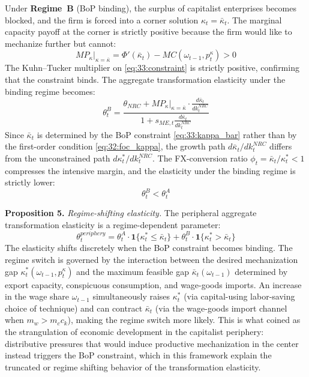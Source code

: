 Under \textbf{Regime~B} (BoP binding), the surplus of capitalist enterprises becomes blocked, and the firm is forced
into a corner solution $\kappa_t = \bar{\kappa}_t$. The
marginal capacity payoff at the corner is strictly positive
because the firm would like to mechanize further but cannot:
\begin{equation}
	MP_\kappa\big|_{\kappa=\bar{\kappa}}
	= \Phi'(\bar{\kappa}_t) - MC(\omega_{t-1}, p^\kappa_t) > 0
	\label{eq:33:MP_corner}
\end{equation}
The Kuhn--Tucker multiplier on \eqref{eq:33:constraint} is
strictly positive, confirming that the constraint binds. The
aggregate transformation elasticity under the binding regime
becomes:
\begin{equation}
	\theta^{B}_t
	= \frac{\theta_{NRC}
		+ MP_\kappa\big|_{\kappa=\bar{\kappa}}
		\cdot \frac{d\bar{\kappa}_t}{dk^{NRC}_t}}
	{1 + s_{ME,t}\frac{d\bar{\kappa}_t}{dk^{NRC}_t}}
	\label{eq:33:theta_B}
\end{equation}
Since $\bar{\kappa}_t$ is determined by the BoP constraint
\eqref{eq:33:kappa_bar} rather than by the first-order
condition \eqref{eq:32:foc_kappa}, the growth path
$d\bar{\kappa}_t / dk^{NRC}_t$ differs from the unconstrained
path $d\kappa_t^* / dk^{NRC}_t$. The FX-conversion ratio
$\phi_t = \bar{\kappa}_t / \kappa_t^* < 1$ compresses the
intensive margin, and the elasticity under the binding regime
is strictly lower:
\begin{equation}
	\theta^{B}_t < \theta^{A}_t
	\label{eq:33:theta_inequality}
\end{equation}

\textbf{Proposition 5.} \textit{Regime-shifting elasticity.}
The peripheral aggregate transformation elasticity is a
regime-dependent parameter:
\begin{equation}
	\theta^{periphery}_t
	= \theta^{A}_t \cdot \mathbf{1}\{\kappa_t^* \le \bar{\kappa}_t\}
	+ \theta^{B}_t \cdot \mathbf{1}\{\kappa_t^* > \bar{\kappa}_t\}
	\label{eq:33:theta_regime}
\end{equation}
The elasticity shifts discretely when the BoP constraint
becomes binding. The regime switch is governed by the
interaction between the desired mechanization gap
$\kappa_t^*(\omega_{t-1}, p^\kappa_t)$ and the maximum
feasible gap $\bar{\kappa}_t(\omega_{t-1})$ determined by
export capacity, conspicuous consumption, and wage-goods
imports. An increase in the wage share $\omega_{t-1}$
simultaneously raises $\kappa_t^*$ (via capital-using 
labor-saving choice of technique) and can contract $\bar{\kappa}_t$ (via
the wage-goods import channel when $m_w > m_c c_k$), making
the regime switch more likely. This is what \citet{Prebisch1981} coined as the strangulation of economic development in the capitalist periphery: distributive pressures that would induce
productive mechanization in the center instead triggers the
BoP constraint, which in this framework explain the truncated or regime shifting behavior of the transformation elasticity.

